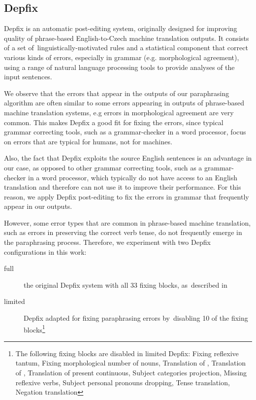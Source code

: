 \subsection{Depfix}
\label{depfix}
Depfix is an automatic post-editing system, originally designed for improving quality
of phrase-based English-to-Czech machine translation outputs. It consists of a
set of~linguistically-motivated rules and a statistical component that correct
various kinds of errors, especially in grammar (e.g. morphological agreement),
using a range of natural language processing tools to provide analyses of the
input sentences. 

We observe that the errors that appear in the outputs of our paraphrasing
algorithm are often similar to some errors appearing in outputs of phrase-based
machine translation systems, e.g errors in morphological agreement are very common.
This makes Depfix a good fit for fixing the errors, since typical
grammar correcting tools, such as a grammar-checker in a word processor,
focus on errors that are typical for humans, not for machines.

Also, the fact that Depfix exploits the source English sentences is an advantage 
in our case, as opposed to other grammar correcting tools, such as a 
grammar-checker in a word processor, which typically do not have access to an 
English translation and therefore can not use it to improve their performance.
For this reason, we apply Depfix post-editing to fix the errors in grammar that 
frequently appear in our outputs.

However, some error types that are common in phrase-based machine translation, 
such as errors in preserving the correct verb tense, do not frequently emerge in the 
paraphrasing process.
Therefore, we experiment with two Depfix configurations in this work:
\begin{description}
\item[full] the original Depfix system with all 33 fixing blocks,
as~described in \cite{rosa:mgr}
\item[limited] Depfix adapted for fixing paraphrasing errors by~disabling 10 of
the fixing blocks\footnote{%
The following fixing blocks are disabled in limited Depfix:
Fixing reflexive tantum,
Fixing morphological number of nouns,
Translation of , 
Translation of , 
Translation of present continuous,
Subject categories projection,
Missing reflexive verbs,
Subject personal pronouns dropping,
Tense translation,
Negation translation}
\end{description}

